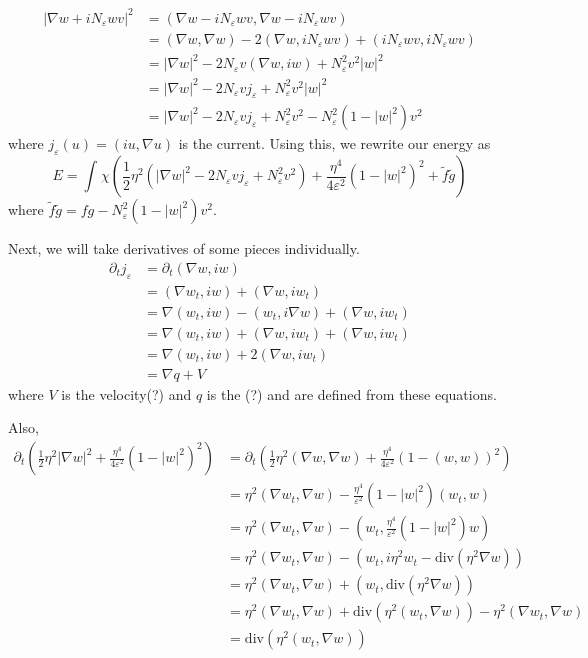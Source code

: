\documentclass[a4paper]{article}
\renewcommand{\div}{\mathrm{div}}
\begin{document}
\begin{align*}
  |\nabla w + iN_\varepsilon w v|^2 &= ( \nabla w - iN_\varepsilon w v , \nabla w - iN_\varepsilon w v ) \\
  &= (\nabla w, \nabla w ) - 2 ( \nabla w, iN_\varepsilon w v ) + ( i N_\varepsilon w v, i N_\varepsilon w v ) \\
  &= | \nabla w |^2 - 2 N_\varepsilon v ( \nabla w, iw ) + N_\varepsilon^2 v^2 |w|^2 \\
  &= | \nabla w |^2 - 2 N_\varepsilon v j_\varepsilon + N_\varepsilon^2 v^2 |w|^2 \\
  &= | \nabla w |^2 - 2 N_\varepsilon v j_\varepsilon + N_\varepsilon^2 v^2 - N_\varepsilon^2 ( 1 - |w|^2 )v^2
\end{align*}
where $j_\varepsilon(u) = (iu, \nabla u)$ is the current.
Using this, we rewrite our energy as
\begin{equation} \label{eqn:energy_form}
  E = \int_{}^{} \chi \left( \frac{1}{2} \eta^2 \left( | \nabla w |^2 - 2 N_\varepsilon v j_\varepsilon + N_\varepsilon^2 v^2
  \right) + \frac{\eta^4}{4 \varepsilon^2} ( 1 - |w|^2)^2 + \tilde{f} \tilde{g} \right)
\end{equation}
where $\tilde{f} \tilde{g} = fg - N_\varepsilon^2 (1 - |w|^2) v^2$.

Next, we will take derivatives of some pieces individually.
\begin{align} \label{eqn:current_deriv}
  \partial_t j_\varepsilon &= \partial_t (\nabla w, iw) \nonumber \\
  &= ( \nabla w_t, iw ) + ( \nabla w, i w_t) \nonumber \\
  &= \nabla( w_t, iw) - (w_t, i \nabla w) + ( \nabla w, i w_t) \nonumber \\
  &= \nabla( w_t, iw) + (\nabla w, i w_t) + ( \nabla w, i w_t) \nonumber \\
  &= \nabla( w_t, iw) + 2(\nabla w, i w_t) \\
  &= \nabla q + V \nonumber
\end{align}
where $V$ is the velocity(?) and $q$ is the (?) and are defined from these equations.

Also,
\begin{align} \label{eqn:?}
  \partial_t \left( \frac{1}{2} \eta^2 | \nabla w |^2 + \frac{\eta^4}{4 \varepsilon^2} (1-|w|^2)^2 \right) &= \partial_t \left( \frac{1}{2} \eta^2
  (\nabla w, \nabla w) + \frac{\eta^4}{4 \varepsilon^2} ( 1 - (w,w))^2 \right) \nonumber \\
  &= \eta^2 (\nabla w_t, \nabla w) - \frac{\eta^4}{ \varepsilon^2} (1 - |w|^2) (w_t,w) \nonumber \\
  &= \eta^2 (\nabla w_t, \nabla w) - \left( w_t, \frac{\eta^4}{\varepsilon^2} (1 - |w|^2)w \right) \nonumber \\
  &= \eta^2 (\nabla w_t, \nabla w) - (w_t, i \eta^2 w_t - \div(\eta^2 \nabla w) ) \nonumber \\
  &= \eta^2 (\nabla w_t, \nabla w) + (w_t, \div(\eta^2 \nabla w)) \nonumber \\
  &= \eta^2 (\nabla w_t, \nabla w) + \div (\eta^2 (w_t, \nabla w)) - \eta^2 (\nabla w_t, \nabla w) \nonumber \\
  &= \div( \eta^2 ( w_t, \nabla w) )
\end{align}
\end{document}
